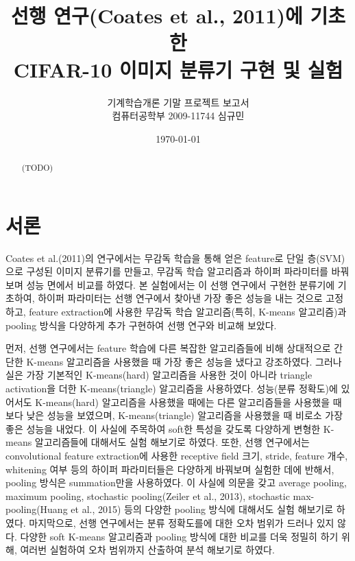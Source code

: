 \documentclass[a4paper,10pt]{article}
\begin{document}
\title{선행 연구(Coates et al., 2011)에 기초한 \\
CIFAR-10 이미지 분류기 구현 및 실험}
\author{기계학습개론 기말 프로젝트 보고서 \\
컴퓨터공학부 2009-11744 심규민}
\date{\koreandate\today}
\maketitle


\begin{abstract}
(TODO)
\end{abstract}

\tableofcontents

\section{서론}

Coates et al.(2011)의 연구에서는 무감독 학습을 통해 얻은 feature로 단일 층(SVM)으로 구성된 이미지 분류기를 만들고, 무감독 학습 알고리즘과 하이퍼 파라미터를 바꿔보며 성능 면에서 비교를 하였다.
본 실험에서는 이 선행 연구에서 구현한 분류기에 기초하여, 하이퍼 파라미터는 선행 연구에서 찾아낸 가장 좋은 성능을 내는 것으로 고정하고, feature extraction에 사용한 무감독 학습 알고리즘(특히, K-means 알고리즘)과 pooling 방식을 다양하게 추가 구현하여 선행 연구와 비교해 보았다.

먼저, 선행 연구에서는 feature 학습에 다른 복잡한 알고리즘들에 비해 상대적으로 간단한 K-means 알고리즘을 사용했을 때 가장 좋은 성능을 냈다고 강조하였다.
그러나 실은 가장 기본적인 K-means(hard) 알고리즘을 사용한 것이 아니라 triangle activation을 더한 K-means(triangle) 알고리즘을 사용하였다.
성능(분류 정확도)에 있어서도 K-means(hard) 알고리즘을 사용했을 때에는 다른 알고리즘들을 사용했을 때 보다 낮은 성능을 보였으며, K-means(triangle) 알고리즘을 사용했을 때 비로소 가장 좋은 성능을 내었다.
이 사실에 주목하여 soft한 특성을 갖도록 다양하게 변형한 K-means 알고리즘들에 대해서도 실험 해보기로 하였다.
또한, 선행 연구에서는 convolutional feature extraction에 사용한 receptive field 크기, stride, feature 개수, whitening 여부 등의 하이퍼 파라미터들은 다양하게 바꿔보며 실험한 데에 반해서, pooling 방식은 summation만을 사용하였다.
이 사실에 의문을 갖고 average pooling, maximum pooling, stochastic pooling(Zeiler et al., 2013), stochastic max-pooling(Huang et al., 2015) 등의 다양한 pooling 방식에 대해서도 실험 해보기로 하였다.
마지막으로, 선행 연구에서는 분류 정확도를에 대한 오차 범위가 드러나 있지 않다.
다양한 soft K-means 알고리즘과 pooling 방식에 대한 비교를 더욱 정밀히 하기 위해, 여러번 실험하여 오차 범위까지 산출하여 분석 해보기로 하였다.
\end{document}
